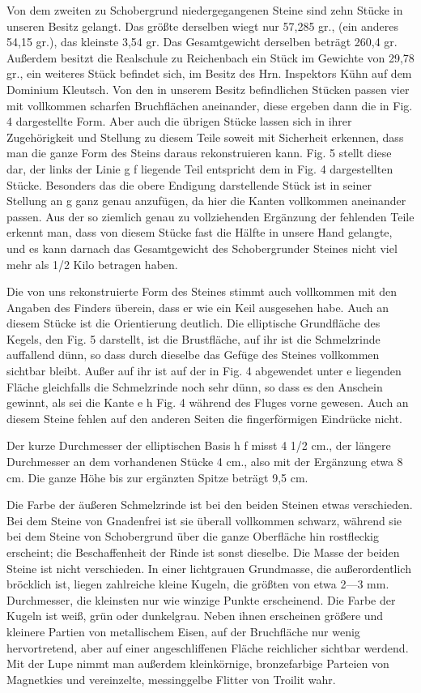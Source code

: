 \documentclass[a4paper, 11pt, oneside]{article}
\begin{document}
Von dem zweiten zu Schobergrund niedergegangenen Steine sind zehn Stücke in unseren Besitz gelangt. Das größte derselben wiegt nur 57,285 gr., (ein anderes 54,15 gr.), das kleinste 3,54 gr. Das Gesamtgewicht derselben beträgt 260,4 gr. Außerdem besitzt die Realschule zu Reichenbach ein Stück im Gewichte von 29,78 gr., ein weiteres Stück befindet sich, im Besitz des Hrn. Inspektors Kühn auf dem Dominium Kleutsch. Von den in unserem Besitz befindlichen Stücken passen vier mit vollkommen scharfen Bruchflächen aneinander, diese ergeben dann die in Fig. 4 dargestellte Form. Aber auch die übrigen Stücke lassen sich in ihrer Zugehörigkeit und Stellung zu diesem Teile soweit mit Sicherheit erkennen, dass man die ganze Form des Steins daraus rekonstruieren kann. Fig. 5 stellt diese dar, der links der Linie g f liegende Teil entspricht dem in Fig. 4 dargestellten Stücke. Besonders das die obere Endigung darstellende Stück ist in seiner Stellung an g ganz genau anzufügen, da hier die Kanten vollkommen aneinander passen. Aus der so ziemlich genau zu vollziehenden Ergänzung der fehlenden Teile erkennt man, dass von diesem Stücke fast die Hälfte in unsere Hand gelangte, und es kann darnach das Gesamtgewicht des Schobergrunder Steines nicht viel mehr als 1/2 Kilo betragen haben.

Die von uns rekonstruierte Form des Steines stimmt auch vollkommen mit den Angaben des Finders überein, dass er wie ein Keil ausgesehen habe. Auch an diesem Stücke ist die Orientierung deutlich. Die elliptische Grundfläche des Kegels, den Fig. 5 darstellt, ist die Brustfläche, auf ihr ist die Schmelzrinde auffallend dünn, so dass durch dieselbe das Gefüge des Steines vollkommen sichtbar bleibt. Außer auf ihr ist auf der in Fig. 4 abgewendet unter e liegenden Fläche gleichfalls die Schmelzrinde noch sehr dünn, so dass es den Anschein gewinnt, als sei die Kante e h Fig. 4 während des Fluges vorne gewesen. Auch an diesem Steine fehlen auf den anderen Seiten die fingerförmigen Eindrücke nicht.

Der kurze Durchmesser der elliptischen Basis h f misst 4 1/2 cm., der längere Durchmesser an dem vorhandenen Stücke 4 cm., also mit der Ergänzung etwa 8 cm. Die ganze Höhe bis zur ergänzten Spitze beträgt 9,5 cm.

Die Farbe der äußeren Schmelzrinde ist bei den beiden Steinen etwas verschieden. Bei dem Steine von Gnadenfrei ist sie überall vollkommen schwarz, während sie bei dem Steine von Schobergrund über die ganze Oberfläche hin rostfleckig erscheint; die Beschaffenheit der Rinde ist sonst dieselbe. Die Masse der beiden Steine ist nicht verschieden. In einer lichtgrauen Grundmasse, die außerordentlich bröcklich ist, liegen zahlreiche kleine Kugeln, die größten von etwa 2---3 mm. Durchmesser, die kleinsten nur wie winzige Punkte erscheinend. Die Farbe der Kugeln ist weiß, grün oder dunkelgrau. Neben ihnen erscheinen größere und kleinere Partien von metallischem Eisen, auf der Bruchfläche nur wenig hervortretend, aber auf einer angeschliffenen Fläche reichlicher sichtbar werdend. Mit der Lupe nimmt man außerdem kleinkörnige, bronzefarbige Parteien von Magnetkies und vereinzelte, messinggelbe Flitter von Troilit wahr.
\end{document}
